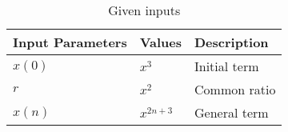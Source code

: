\begin{table}[htbp]
\centering
\def\arraystrech{1.5}
	\begin{tabular}{|p{2.5cm}|p{1.5cm}|p{3cm}|}
\hline
		\textbf{Input Parameters} & \textbf{Values} & \textbf{Description} \\
\hline
		$x(0)$ & $x^3$ & Initial term\\
\hline
		$r$ & $x^2$ & Common ratio\\
\hline
		$x(n)$ & $x^{2n+3}$ & General term \\
\hline
\end{tabular}
\caption{Given inputs}
\label{tab:1.11.9.3.Q10}
\end{table}
